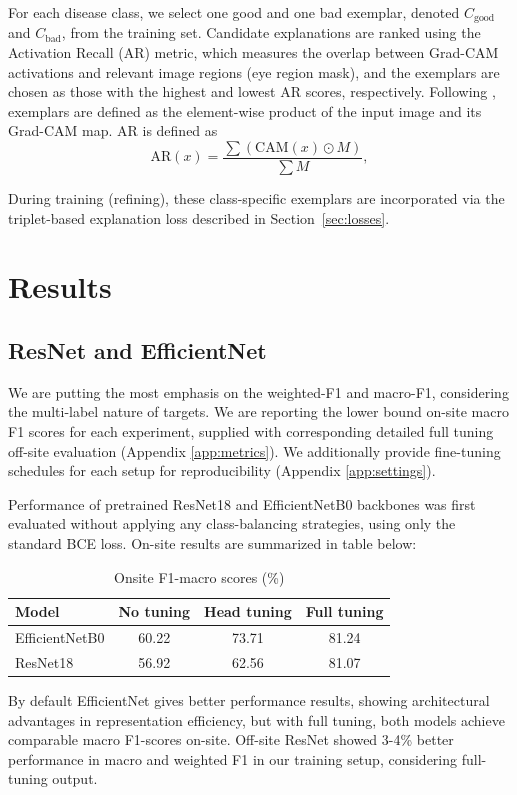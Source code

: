 \documentclass{article}
\begin{document}
For each disease class, we select one good and one bad exemplar, denoted $C_{\text{good}}$ and $C_{\text{bad}}$, from the training set. Candidate explanations are ranked using the Activation Recall (AR) metric, which measures the overlap between Grad-CAM activations and relevant image regions (eye region mask), and the exemplars are chosen as those with the highest and lowest AR scores, respectively. Following \cite{hagos2023learning}, exemplars are defined as the element-wise product of the input image and its Grad-CAM map. AR is defined as
\begin{equation}
\mathrm{AR}(x)
=
\frac{\sum \left(\mathrm{CAM}(x) \odot M\right)}{\sum M},
\end{equation}

During training (refining), these class-specific exemplars are incorporated via the triplet-based explanation loss described in Section~\ref{sec:losses}.


\section{Results}
\subsection{ResNet and EfficientNet}
We are putting the most emphasis on the weighted-F1 and macro-F1, considering the multi-label nature of targets. We are reporting the lower bound on-site macro F1 scores for each experiment, supplied with corresponding detailed full tuning off-site evaluation (Appendix \ref{app:metrics}). We additionally provide fine-tuning schedules for each setup for reproducibility (Appendix \ref{app:settings}).

Performance of pretrained ResNet18 and EfficientNetB0 backbones was first evaluated without applying any class-balancing strategies, using only the standard BCE loss. On-site results are summarized in table below:

\begin{table}[H]
\centering
\begin{tabular}{lccc}
    \toprule
    \textbf{Model} & \textbf{No tuning} & \textbf{Head tuning} & \textbf{Full tuning}\\
    \midrule
    EfficientNetB0 & 60.22 & 73.71 & 81.24 \\
    ResNet18 & 56.92 & 62.56 & 81.07\\
    \bottomrule
\end{tabular}
\caption{Onsite F1-macro scores (\%)}
\label{tab:onsite_task1}
\end{table}
By default EfficientNet gives better performance results, showing architectural advantages in representation efficiency, but with full tuning, both models achieve comparable macro F1-scores on-site. Off-site ResNet showed 3-4\% better performance in macro and weighted F1 in our training setup, considering full-tuning output.
\end{document}
